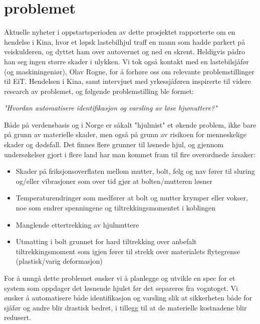 
\section{problemet}

Aktuelle nyheter i oppstartsperioden av dette prosjektet rapporterte om en 
hendelse i Kina, hvor et løpsk lastebilhjul traff en mann som hadde parkert på 
veiskulderen, og dyttet ham over autovernet og ned en skrent. Heldigvis pådro 
han seg ingen større skader i ulykken. Vi tok også kontakt med en lastebilsjåfør
 (og maskiningeniør), Olav Rogne, for å forhøre oss om relevante problemstillinger 
til EiT. Hendelsen i Kina, samt intervjuet med yrkessjåføren inspirerte til videre
research av problemet, og følgende problemstilling ble formet:

\begin{center}
\emph{"Hvordan automatisere identifikasjon og varsling av løse hjumuttere?"}
\end{center}

Både på verdensbasis og i Norge er såkalt "hjulmist" et økende problem, ikke bare 
på grunn av materielle skader, men også på grunn av risikoen for menneskelige 
skader og dødsfall. Det finnes flere grunner til løsnede hjul, og gjennom undersøkelser 
gjort i flere land har man kommet fram til fire overordnede årsaker:

\begin{itemize}
\item{ Skader på friksjonsoverflaten mellom mutter, bolt, felg og nav fører til sluring og/eller
vibrasjoner som over tid gjør at bolten/mutteren løsner}
\item { Temperaturendringer som medfører at bolt og mutter krymper eller vokser, noe som 
endrer spenningene og tiltrekkingsmomentet i koblingen}
\item{ Manglende ettertrekking av hjulmuttere}
\item{ Utmatting i bolt grunnet for hard tiltrekking over anbefalt tiltrekkingsmoment som igjen 
fører til strekk over materialets flytegrense (plastisk/varig deformasjon)}
\end{itemize}

For å unngå dette problemet ønsker vi å planlegge og utvikle en spec for et system som oppdager 
det løsnende hjulet før det separeres fra vogntoget. Vi ønsker å automatisere både identifikasjon
og varsling slik at sikkerheten både for sjåfør og andre blir drastisk bedret, i tillegg til at de materielle
kostnadene blir redusert.


